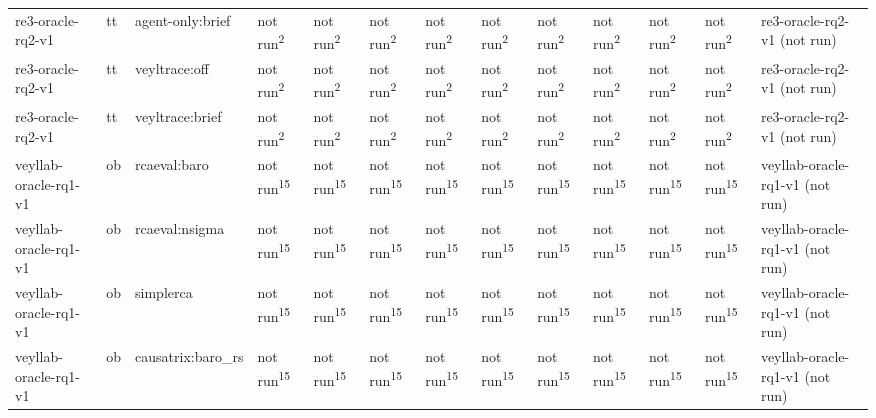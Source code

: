 \begin{table}[t]
\begin{tabular}{lllllllllllll}
re3-oracle-rq2-v1 & tt & agent-only:brief & not run\textsuperscript{2} & not run\textsuperscript{2} & not run\textsuperscript{2} & not run\textsuperscript{2} & not run\textsuperscript{2} & not run\textsuperscript{2} & not run\textsuperscript{2} & not run\textsuperscript{2} & not run\textsuperscript{2} & re3-oracle-rq2-v1 (not run) \\
re3-oracle-rq2-v1 & tt & veyltrace:off & not run\textsuperscript{2} & not run\textsuperscript{2} & not run\textsuperscript{2} & not run\textsuperscript{2} & not run\textsuperscript{2} & not run\textsuperscript{2} & not run\textsuperscript{2} & not run\textsuperscript{2} & not run\textsuperscript{2} & re3-oracle-rq2-v1 (not run) \\
re3-oracle-rq2-v1 & tt & veyltrace:brief & not run\textsuperscript{2} & not run\textsuperscript{2} & not run\textsuperscript{2} & not run\textsuperscript{2} & not run\textsuperscript{2} & not run\textsuperscript{2} & not run\textsuperscript{2} & not run\textsuperscript{2} & not run\textsuperscript{2} & re3-oracle-rq2-v1 (not run) \\
veyllab-oracle-rq1-v1 & ob & rcaeval:baro & not run\textsuperscript{15} & not run\textsuperscript{15} & not run\textsuperscript{15} & not run\textsuperscript{15} & not run\textsuperscript{15} & not run\textsuperscript{15} & not run\textsuperscript{15} & not run\textsuperscript{15} & not run\textsuperscript{15} & veyllab-oracle-rq1-v1 (not run) \\
veyllab-oracle-rq1-v1 & ob & rcaeval:nsigma & not run\textsuperscript{15} & not run\textsuperscript{15} & not run\textsuperscript{15} & not run\textsuperscript{15} & not run\textsuperscript{15} & not run\textsuperscript{15} & not run\textsuperscript{15} & not run\textsuperscript{15} & not run\textsuperscript{15} & veyllab-oracle-rq1-v1 (not run) \\
veyllab-oracle-rq1-v1 & ob & simplerca & not run\textsuperscript{15} & not run\textsuperscript{15} & not run\textsuperscript{15} & not run\textsuperscript{15} & not run\textsuperscript{15} & not run\textsuperscript{15} & not run\textsuperscript{15} & not run\textsuperscript{15} & not run\textsuperscript{15} & veyllab-oracle-rq1-v1 (not run) \\
veyllab-oracle-rq1-v1 & ob & causatrix:baro\_rs & not run\textsuperscript{15} & not run\textsuperscript{15} & not run\textsuperscript{15} & not run\textsuperscript{15} & not run\textsuperscript{15} & not run\textsuperscript{15} & not run\textsuperscript{15} & not run\textsuperscript{15} & not run\textsuperscript{15} & veyllab-oracle-rq1-v1 (not run) \\

\end{tabular}
\end{table}
